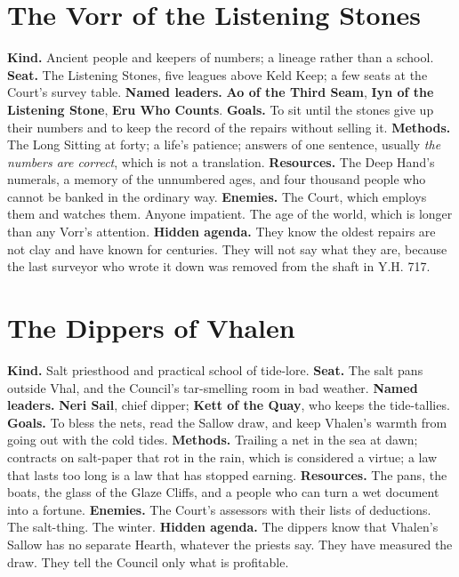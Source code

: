 \documentclass{design/chronicle}
\begin{document}
\section*{The Vorr of the Listening Stones}

\textbf{Kind.} Ancient people and keepers of numbers; a lineage rather than a school. \textbf{Seat.} The Listening Stones, five leagues above Keld Keep; a few seats at the Court’s survey table. \textbf{Named leaders.} \textbf{Ao of the Third Seam}, \textbf{Iyn of the Listening Stone}, \textbf{Eru Who Counts}. \textbf{Goals.} To sit until the stones give up their numbers and to keep the record of the repairs without selling it. \textbf{Methods.} The Long Sitting at forty; a life’s patience; answers of one sentence, usually \emph{the numbers are correct}, which is not a translation. \textbf{Resources.} The Deep Hand’s numerals, a memory of the unnumbered ages, and four thousand people who cannot be banked in the ordinary way. \textbf{Enemies.} The Court, which employs them and watches them. Anyone impatient. The age of the world, which is longer than any Vorr’s attention. \textbf{Hidden agenda.} They know the oldest repairs are not clay and have known for centuries. They will not say what they are, because the last surveyor who wrote it down was removed from the shaft in Y.H. 717.

\section*{The Dippers of Vhalen}

\textbf{Kind.} Salt priesthood and practical school of tide-lore. \textbf{Seat.} The salt pans outside Vhal, and the Council’s tar-smelling room in bad weather. \textbf{Named leaders.} \textbf{Neri Sail}, chief dipper; \textbf{Kett of the Quay}, who keeps the tide-tallies. \textbf{Goals.} To bless the nets, read the Sallow draw, and keep Vhalen’s warmth from going out with the cold tides. \textbf{Methods.} Trailing a net in the sea at dawn; contracts on salt-paper that rot in the rain, which is considered a virtue; a law that lasts too long is a law that has stopped earning. \textbf{Resources.} The pans, the boats, the glass of the Glaze Cliffs, and a people who can turn a wet document into a fortune. \textbf{Enemies.} The Court’s assessors with their lists of deductions. The salt-thing. The winter. \textbf{Hidden agenda.} The dippers know that Vhalen’s Sallow has no separate Hearth, whatever the priests say. They have measured the draw. They tell the Council only what is profitable.
\end{document}
